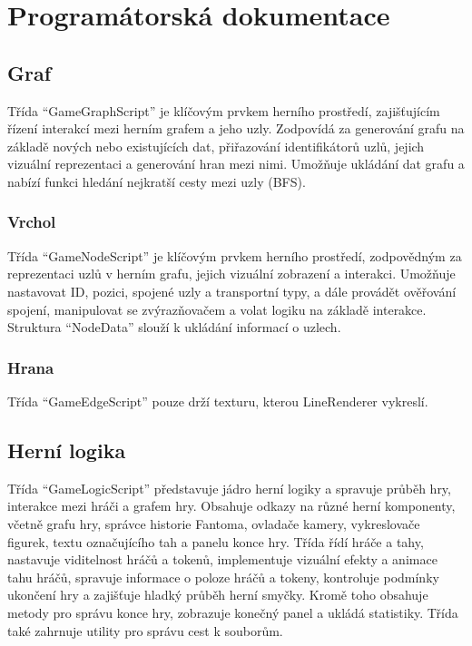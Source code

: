 \chapter{Programátorská
dokumentace}\label{programuxe1torskuxe1-dokumentace}

\section{Graf}\label{graf}

Třída ``GameGraphScript'' je klíčovým prvkem herního prostředí,
zajišťujícím řízení interakcí mezi herním grafem a jeho uzly. Zodpovídá
za generování grafu na základě nových nebo existujících dat, přiřazování
identifikátorů uzlů, jejich vizuální reprezentaci a generování hran mezi
nimi. Umožňuje ukládání dat grafu a nabízí funkci hledání nejkratší
cesty mezi uzly (BFS).

\subsection{Vrchol}\label{vrchol}

Třída ``GameNodeScript'' je klíčovým prvkem herního prostředí,
zodpovědným za reprezentaci uzlů v herním grafu, jejich vizuální
zobrazení a interakci. Umožňuje nastavovat ID, pozici, spojené uzly a
transportní typy, a dále provádět ověřování spojení, manipulovat se
zvýrazňovačem a volat logiku na základě interakce. Struktura
``NodeData'' slouží k ukládání informací o uzlech.

\subsection{Hrana}\label{hrana}

Třída ``GameEdgeScript'' pouze drží texturu, kterou LineRenderer
vykreslí.

\section{Herní logika}\label{hernuxed-logika}

Třída ``GameLogicScript'' představuje jádro herní logiky a spravuje
průběh hry, interakce mezi hráči a grafem hry. Obsahuje odkazy na různé
herní komponenty, včetně grafu hry, správce historie Fantoma, ovladače
kamery, vykreslovače figurek, textu označujícího tah a panelu konce hry.
Třída řídí hráče a tahy, nastavuje viditelnost hráčů a tokenů,
implementuje vizuální efekty a animace tahu hráčů, spravuje informace o
poloze hráčů a tokeny, kontroluje podmínky ukončení hry a zajišťuje
hladký průběh herní smyčky. Kromě toho obsahuje metody pro správu konce
hry, zobrazuje konečný panel a ukládá statistiky. Třída také zahrnuje
utility pro správu cest k souborům.


